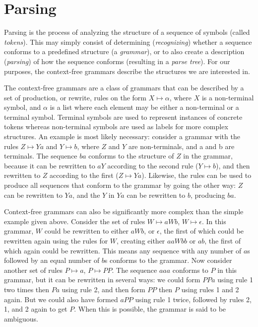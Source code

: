 \chapter{Parsing} \label{Parsing}

	Parsing is the process of analyzing the structure of a sequence of symbols
	(called \emph{tokens}). This may simply consist of determining
	(\emph{recognizing}) whether a sequence conforms to a predefined structure
	(a \emph{grammar}), or to also create a description (\emph{parsing}) of how
	the sequence conforms (resulting in a \emph{parse tree}). For our
	purposes, the context-free grammars describe the structures we are
	interested in.

	The context-free grammars are a class of grammars that can be described by
	a set of production, or rewrite, rules on the form $X \mapsto \alpha$,
	where $X$ is a non-terminal symbol, and $\alpha$ is a list where each
	element may be either a non-terminal or a terminal symbol. Terminal symbols
	are used to represent instances of concrete tokens whereas non-terminal
	symbols are used as labels for more complex structures. An example is most
	likely necessary: consider a grammar with the rules $Z \mapsto Ya$ and $Y
	\mapsto b$, where $Z$ and $Y$ are non-terminals, and a and b are terminals.
	The sequence $ba$ conforms to the structure of $Z$ in the grammar,
	because it can be rewritten to $aY$ according to the second rule ($Y
	\mapsto b$), and then rewritten to $Z$ according to the first ($Z \mapsto
	Ya$). Likewise, the rules can be used to produce all sequences that conform
	to the grammar by going the other way: $Z$ can be rewritten to $Ya$, and 
	the $Y$ in $Ya$ can be rewritten to $b$, producing $ba$.

	Context-free grammars can also be significantly more complex than the
	simple example given above. Consider the set of rules {$W \mapsto aWb$, $W
	\mapsto \epsilon$}. In this grammar, $W$ could be rewritten to either
	$aWb$, or $\epsilon$, the first of which could be rewritten again using the
	rules for $W$, creating either $aaWbb$ or $ab$, the first of which again
	could be rewritten. This means any sequence with any number of $a$s
	followed by an equal number of $b$s conforms to the grammar. Now consider
	another set of rules {$P \mapsto a$, $P \mapsto PP$}. The sequence $aaa$
	conforms to $P$ in this grammar, but it can be rewritten in several ways:
	we could form $PPa$ using rule 1 two times then $Pa$ using rule 2, and then
	form $PP$ then $P$ using rules 1 and 2 again. But we could also have formed
	$aPP$ using rule 1 twice, followed by rules 2, 1, and 2 again to get $P$. 
	When this is possible, the grammar is said to be ambiguous.

